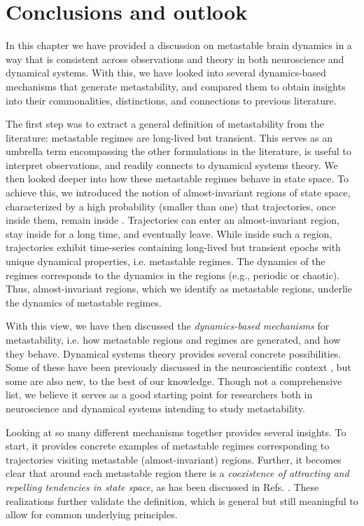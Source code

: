 \section{Conclusions and outlook}
In this chapter we have provided a discussion on metastable brain dynamics in a way that is consistent across observations and theory in both neuroscience and dynamical systems. With this, we have looked into several dynamics-based mechanisms that generate metastability, and compared them to obtain insights into their commonalities, distinctions, and connections to previous literature.

The first step was to extract a general definition of metastability from the literature: metastable regimes are long-lived but transient. This serves as an umbrella term encompassing the other formulations in the literature, is useful to interpret observations, and readily connects to dynamical systems theory. We then looked deeper into how these metastable regimes behave in state space. To achieve this, we introduced the notion of almost-invariant regions of state space, characterized by a high probability (smaller than one) that trajectories, once inside them, remain inside \cite{froyland2005statistically, dellnitz2003congestion}. Trajectories can enter an almost-invariant region, stay inside for a long time, and eventually leave. While inside such a region, trajectories exhibit time-series containing long-lived but transient epochs with unique dynamical properties, i.e. metastable regimes. The dynamics of the regimes corresponds to the dynamics in the regions (e.g., periodic or chaotic). Thus, almost-invariant regions, which we identify as metastable regions, underlie the dynamics of metastable regimes. 

With this view, we have then discussed the \textit{dynamics-based mechanisms} for metastability, i.e. how metastable regions and regimes are generated, and how they behave. Dynamical systems theory provides several concrete possibilities. Some of these have been previously discussed in the neuroscientific context \cite{graben2019metastable, cavanna2018dynamic, brinkman2022metastable}, but some are also new, to the best of our knowledge. Though not a comprehensive list, we believe it serves as a good starting point for researchers both in neuroscience and dynamical systems intending to study metastability. 

Looking at so many different mechanisms together provides several insights. To start, it provides concrete examples of metastable regimes corresponding to trajectories visiting metastable (almost-invariant) regions. Further, it becomes clear that around each metastable region there is a \textit{coexistence of attracting and repelling tendencies in state space}, as has been discussed in Refs. \cite{tognoli2014metastable, kaneko2003chaotic}. These realizations further validate the definition, which is general but still meaningful to allow for common underlying principles.

